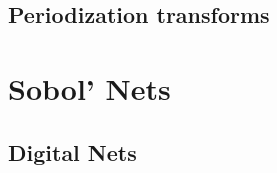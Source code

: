 \documentclass[handout, 10pt,compress,xcolor={usenames,dvipsnames}]{beamer} %
\def\abs#1{\ensuremath{\left \lvert #1 \right \rvert}}
\begin{document}
\subsection{Periodization transforms}

\section{Sobol' Nets}


\iffalse
\subsection{Digital Nets}
\end{document}
